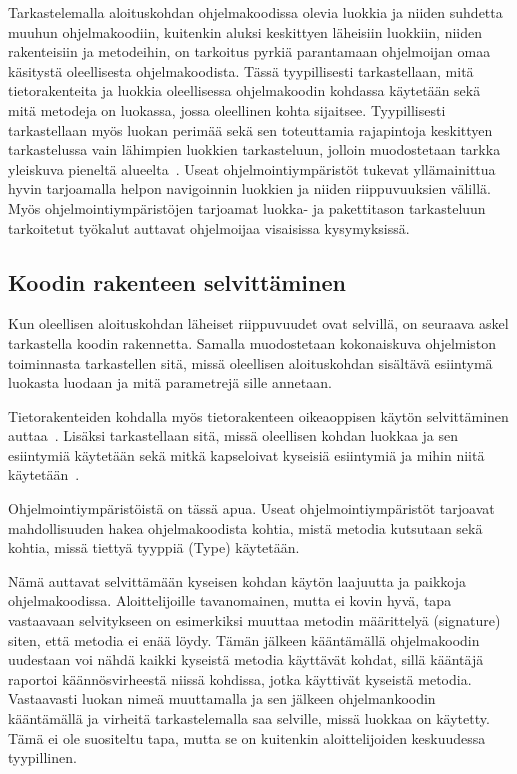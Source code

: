 \documentclass[finnish]{tktltiki2}
\theoremstyle{definition}
\theoremstyle{remark}
\begin{document}
Tarkastelemalla aloituskohdan ohjelmakoodissa olevia luokkia ja niiden suhdetta muuhun ohjelmakoodiin, kuitenkin aluksi keskittyen läheisiin luokkiin, niiden rakenteisiin ja metodeihin, on tarkoitus pyrkiä parantamaan ohjelmoijan omaa käsitystä oleellisesta ohjelmakoodista. Tässä tyypillisesti tarkastellaan, mitä tietorakenteita ja luokkia oleellisessa ohjelmakoodin kohdassa käytetään sekä mitä metodeja on luokassa, jossa oleellinen kohta sijaitsee. Tyypillisesti tarkastellaan myös luokan perimää sekä sen toteuttamia rajapintoja keskittyen tarkastelussa vain lähimpien luokkien tarkasteluun, jolloin muodostetaan tarkka yleiskuva pieneltä alueelta~\cite{questions-during-software-evolution-tasks}.
Useat ohjelmointiympäristöt tukevat yllämainittua hyvin tarjoamalla helpon navigoinnin luokkien ja niiden riippuvuuksien välillä. Myös ohjelmointiympäristöjen tarjoamat luokka- ja pakettitason tarkasteluun tarkoitetut työkalut auttavat ohjelmoijaa visaisissa kysymyksissä.

\subsection{Koodin rakenteen selvittäminen}
Kun oleellisen aloituskohdan läheiset riippuvuudet ovat selvillä, on seuraava askel tarkastella koodin rakennetta. Samalla muodostetaan kokonaiskuva ohjelmiston toiminnasta tarkastellen sitä, missä oleellisen aloituskohdan sisältävä esiintymä luokasta luodaan ja mitä parametrejä sille annetaan.

Tietorakenteiden kohdalla myös tietorakenteen oikeaoppisen käytön selvittäminen auttaa~\cite{eliciting-design-requirements-for-maintenance-oriented-ides}. Lisäksi tarkastellaan sitä, missä oleellisen kohdan luokkaa ja sen esiintymiä käytetään sekä mitkä kapseloivat kyseisiä esiintymiä ja mihin niitä käytetään~\cite{questions-during-software-evolution-tasks}.

Ohjelmointiympäristöistä on tässä apua. Useat ohjelmointiympäristöt tarjoavat mahdollisuuden hakea ohjelmakoodista kohtia, mistä metodia kutsutaan sekä kohtia, missä tiettyä tyyppiä (Type) käytetään.

Nämä auttavat selvittämään kyseisen kohdan käytön laajuutta ja paikkoja ohjelmakoodissa. Aloittelijoille tavanomainen, mutta ei kovin hyvä, tapa vastaavaan selvitykseen on esimerkiksi muuttaa metodin määrittelyä (signature) siten, että metodia ei enää löydy. Tämän jälkeen kääntämällä ohjelmakoodin uudestaan voi nähdä kaikki kyseistä metodia käyttävät kohdat, sillä kääntäjä raportoi käännösvirheestä niissä kohdissa, jotka käyttivät kyseistä metodia. Vastaavasti luokan nimeä muuttamalla ja sen jälkeen ohjelmankoodin kääntämällä ja virheitä tarkastelemalla saa selville, missä luokkaa on käytetty. Tämä ei ole suositeltu tapa, mutta se on kuitenkin aloittelijoiden keskuudessa tyypillinen.
\end{document}
